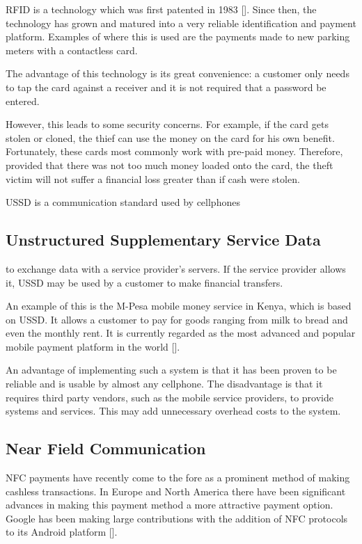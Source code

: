 RFID is a technology which was first patented in 1983
[\cite{patent:nfc-patent}]. Since then, the technology has grown and matured into a very
reliable identification and payment platform. Examples of where this is used are the
payments made to new parking meters with a contactless card.

The advantage of this technology is its great convenience: a customer only needs
to tap the card against a receiver and it is not required that a password be
entered.

However, this leads to some security concerns. For example, if the card gets stolen
or cloned, the thief can use the money on the card for his own benefit.
Fortunately, these cards most commonly work with pre-paid money.
Therefore, provided that there was not too much money loaded onto the card, the
theft victim will not suffer a financial loss greater than if cash were stolen. 

USSD is a communication standard used by cellphones
\subsection{Unstructured Supplementary Service Data}

to exchange data with a service provider's servers. If the service provider allows it, USSD may
be used by a customer to make financial transfers. 

An example of this is the M-Pesa mobile money service in Kenya, which is based on USSD.
It allows a customer to pay for goods ranging from milk to bread and even the monthly
rent. It is currently regarded as the most advanced and popular mobile payment platform
in the world [\cite{journal:m-pesa}].

An advantage of implementing such a system is that it has been proven to be reliable and
is usable by almost any cellphone. The disadvantage is that it requires third party
vendors, such as the mobile service providers, to provide systems and services. This may
add unnecessary overhead costs to the system.

\subsection{Near Field Communication}

NFC payments have recently come to the fore as a
prominent method of making cashless transactions. In Europe and North
America there have been significant advances in making this payment method a
more attractive payment option. Google has been making large contributions with
the addition of NFC protocols to its Android platform
[\cite{website:android-gingerbread}].

